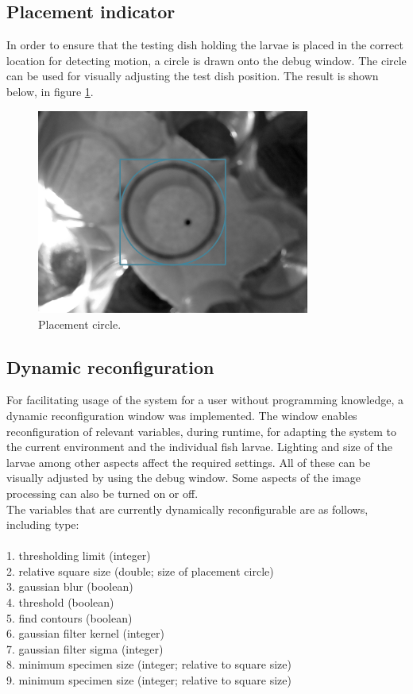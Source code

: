 \documentclass[10pt,a4paper, singlespace]{article}
\begin{document}
\subsection{Placement indicator}
In order to ensure that the testing dish holding the larvae is placed in the correct location for detecting motion, a circle is drawn onto the debug window. The circle can be used for visually adjusting the test dish position. The result is shown below, in figure \ref{fig:placement}.\\

\begin{figure}[H]
	\centering	
	\includegraphics[width=0.8\textwidth]{placement_circle.png}
	\caption{Placement circle.}
	\label{fig:placement}
\end{figure} 

\subsection{Dynamic reconfiguration}
For facilitating usage of the system for a user without programming knowledge, a dynamic reconfiguration window was implemented. The window enables reconfiguration of relevant variables, during runtime, for adapting the system to the current environment and the individual fish larvae. Lighting and size of the larvae among other aspects affect the required settings. All of these can be visually adjusted by using the debug window. Some aspects of the image processing can also be turned on or off.\\
The variables that are currently dynamically reconfigurable are as follows, including type:\\
\\
1. thresholding limit (integer)\\
2. relative square size (double; size of placement circle)\\
3. gaussian blur (boolean)\\
4. threshold (boolean)\\
5. find contours (boolean)\\
6. gaussian filter kernel (integer)\\
7. gaussian filter sigma (integer)\\
8. minimum specimen size (integer; relative to square size)\\
9. minimum specimen size (integer; relative to square size) \\
\end{document}
